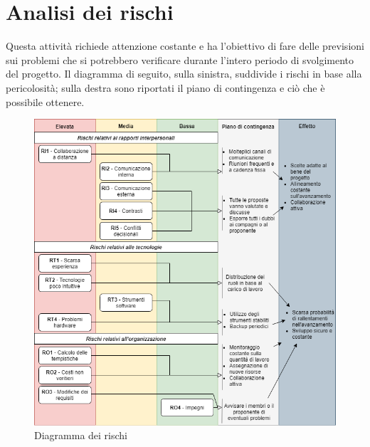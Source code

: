 \section{Analisi dei rischi}

Questa attività richiede attenzione costante e ha l'obiettivo di fare delle previsioni sui problemi che si potrebbero verificare durante l'intero periodo di svolgimento del progetto. Il diagramma di seguito, sulla sinistra, suddivide i rischi in base alla pericolosità; sulla destra sono riportati il piano di contingenza e ciò che è possibile ottenere.

\begin{figure}[!htb]
\includegraphics[width=17.5cm]{Images/rischi}
\caption{Diagramma dei rischi}
\end{figure}

\renewcommand{\arraystretch}{2}%
